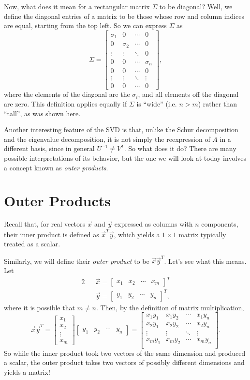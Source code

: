 \documentclass[letterpaper]{article}
\theoremstyle{remark}
\newcommand{\mat}[1]{\ensuremath{\begin{bmatrix}#1\end{bmatrix}}}
\newcommand{\eqn}[1]{\begin{alignat*}{2}#1\end{alignat*}}
\begin{document}
Now, what does it mean for a rectangular matrix $\Sigma$ to be diagonal? Well, we define the diagonal entries of a matrix to be those whose row and column indices are equal, starting from the top left. So we can express $\Sigma$ as
\[
    \Sigma = \mat{\sigma_1 & 0 & \cdots & 0 \\ 0 & \sigma_2 & \cdots & 0 \\
    \vdots & \vdots & \ddots & 0 \\ 0 & 0 & \cdots & \sigma_n \\ 0 & 0 & \cdots & 0 \\ \vdots & \vdots & \ddots & \vdots \\ 0 & 0 & \cdots & 0},
\]
where the elements of the diagonal are the $\sigma_i$, and all elements off the diagonal are zero. This definition applies equally if $\Sigma$ is ``wide'' (i.e. $n > m$) rather than ``tall'', as was shown here.

Another interesting feature of the SVD is that, unlike the Schur decomposition and the eigenvalue decomposition, it is not simply the reexpression of $A$ in a different basis, since in general $U^{-1} \ne V^T$. So what does it do? There are many possible interpretations of its behavior, but the one we will look at today involves a concept known as \emph{outer products}.

\section{Outer Products}
Recall that, for real vectors $\vec{x}$ and $\vec{y}$ expressed as columns with $n$ components, their inner product is defined as $\vec{x}^T\vec{y}$, which yields a $1\times 1$ matrix typically treated as a scalar.

Similarly, we will define their \emph{outer product} to be $\vec{x}\vec{y}^T$. Let's see what this means. Let
\eqn{
    && \vec{x} = \mat{x_1 & x_2 & \cdots & x_m}^T \\
    && \vec{y} = \mat{y_1 & y_2 & \cdots & y_n}^T,
}
where it is possible that $m \ne n$. Then, by the definition of matrix multiplication,
\[
    \vec{x}\vec{y}^T = \mat{x_1 \\ x_2 \\ \vdots \\ x_m}\mat{y_1 & y_2 & \cdots & y_n} = 
    \mat{x_1y_1 & x_1y_2 & \cdots & x_1y_n \\
    x_2y_1 & x_2y_2 & \cdots & x_2y_n \\
    \vdots & \vdots & \ddots & \vdots \\
    x_my_1 & x_my_2 & \cdots & x_my_n \\
    }.
\]
So while the inner product took two vectors of the same dimension and produced a scalar, the outer product takes two vectors of possibly different dimensions and yields a matrix! 
\end{document}
